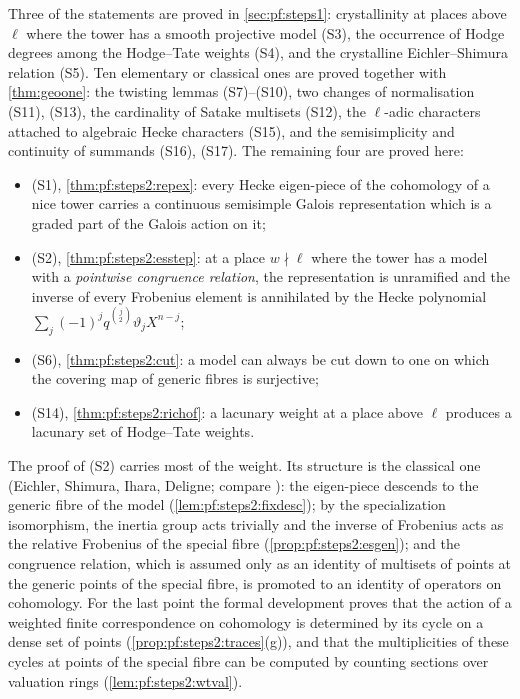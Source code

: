 Three of the statements are proved in \cref{sec:pf:steps1}: crystallinity at places above $\ell$
where the tower has a smooth projective model (S3), the occurrence of Hodge degrees among the
Hodge--Tate weights (S4), and the crystalline Eichler--Shimura relation (S5). Ten elementary or
classical ones are proved together with \cref{thm:geoone}: the twisting lemmas (S7)--(S10), two
changes of normalisation (S11), (S13), the cardinality of Satake multisets (S12), the $\ell$-adic
characters attached to algebraic Hecke characters (S15), and the semisimplicity and continuity of
summands (S16), (S17). The remaining four are proved here:
\begin{itemize}[nosep]
\item (S1), \cref{thm:pf:steps2:repex}: every Hecke eigen-piece of the cohomology of a nice tower
  carries a continuous semisimple Galois representation which is a graded part of the Galois action
  on it;
\item (S2), \cref{thm:pf:steps2:esstep}: at a place $w\nmid\ell$ where the tower has a model with a
  \emph{pointwise congruence relation}, the representation is unramified and the inverse of every
  Frobenius element is annihilated by the Hecke polynomial
  $\sum_j(-1)^jq^{\binom j2}\vartheta_jX^{n-j}$;
\item (S6), \cref{thm:pf:steps2:cut}: a model can always be cut down to one on which the covering
  map of generic fibres is surjective;
\item (S14), \cref{thm:pf:steps2:richof}: a lacunary weight at a place above $\ell$ produces a
  lacunary set of Hodge--Tate weights.
\end{itemize}
The proof of (S2) carries most of the weight. Its structure is the classical one (Eichler, Shimura,
Ihara, Deligne; compare \cite{Deligne1971,HarrisTaylor2001}): the eigen-piece descends to the
generic fibre of the model (\cref{lem:pf:steps2:fixdesc}); by the specialization isomorphism, the
inertia group acts trivially and the inverse of Frobenius acts as the relative Frobenius of the
special fibre (\cref{prop:pf:steps2:esgen}); and the congruence relation, which is assumed only as
an identity of multisets of points at the generic points of the special fibre, is promoted to an
identity of operators on cohomology. For the last point the formal development proves that the
action of a weighted finite correspondence on cohomology is determined by its cycle on a dense set
of points (\cref{prop:pf:steps2:traces}(g)), and that the multiplicities of these cycles at points
of the special fibre can be computed by counting sections over valuation rings
(\cref{lem:pf:steps2:wtval}).

